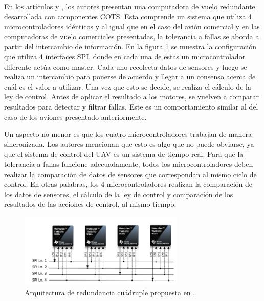 En los artículos \cite{hiergeist2018implementation} y \cite{hiergeist2017internal}, los autores presentan una computadora de vuelo redundante desarrollada con componentes COTS. Esta comprende un sistema que utiliza 4 microcontroladores idénticos y al igual que en el caso del avión comercial y en las computadoras de vuelo comerciales presentadas, la tolerancia a fallas se aborda a partir del intercambio de información. En la figura \ref{fig:redundancy_SPI} se muestra la configuración que utiliza 4 interfaces SPI, donde en cada una de estas un microcontrolador diferente actúa como master. Cada uno recolecta datos de sensores y luego se realiza un intercambio para ponerse de acuerdo y llegar a un consenso acerca de cuál es el valor a utilizar. Una vez que esto se decide, se realiza el cálculo de la ley de control. Antes de aplicar el resultado a los motores, se vuelven a comparar resultados para detectar y filtrar fallas. Este es un comportamiento similar al del caso de los aviones presentado anteriormente.

Un aspecto no menor es que los cuatro microcontroladores trabajan de manera sincronizada. Los autores mencionan que esto es algo que no puede obviarse, ya que el sistema de control del UAV es un sistema de tiempo real. Para que la tolerancia a fallas funcione adecuadamente, todos los microcontroladores deben realizar la comparación de datos de sensores que correspondan al mismo ciclo de control. En otras palabras, los 4 microcontroladores realizan la comparación de los datos de sensores, el cálculo de la ley de control y comparación de los resultados de las acciones de control, al mismo tiempo. %

\begin{figure}[htb]
    \centering
    \includegraphics[width=0.7\textwidth]{img/redundancy_SPI.png}
    \caption{Arquitectura de redundancia cuádruple propuesta en \cite{hiergeist2018implementation}.}
    \label{fig:redundancy_SPI}
\end{figure}

